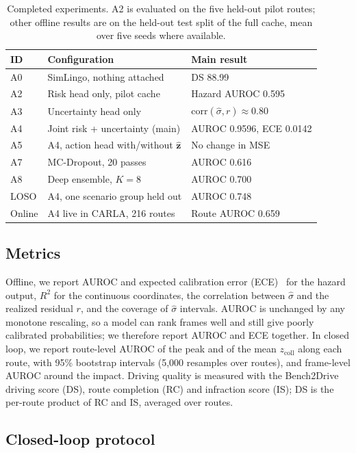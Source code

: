 \documentclass[conference]{IEEEtran}
\newcommand{\zcoll}{z_{\mathrm{coll}}}
\newcommand{\sighat}{\hat{\sigma}}
\begin{document}
\begin{table}[t]
\centering
\caption{Completed experiments. A2 is evaluated on the five held-out pilot
routes; other offline results are on the held-out test split of the full cache, mean
over five seeds where available.}
\label{tab:exp}
\footnotesize
\setlength{\tabcolsep}{3pt}
\begin{tabular}{@{}l l l@{}}
\toprule
ID & Configuration & Main result \\
\midrule
A0 & SimLingo, nothing attached & DS 88.99 \\
A2 & Risk head only, pilot cache & Hazard AUROC 0.595 \\
A3 & Uncertainty head only & $\mathrm{corr}(\sighat,r)\approx0.80$ \\
A4 & Joint risk + uncertainty (main) & AUROC 0.9596, ECE 0.0142 \\
A5 & A4, action head with/without $\hat{\mathbf{z}}$ & No change in MSE \\
A7 & MC-Dropout, 20 passes & AUROC 0.616 \\
A8 & Deep ensemble, $K=8$ & AUROC 0.700 \\
LOSO & A4, one scenario group held out & AUROC 0.748 \\
Online & A4 live in CARLA, 216 routes & Route AUROC 0.659 \\
\bottomrule
\end{tabular}
\end{table}

\subsection{Metrics}

Offline, we report AUROC and expected calibration error (ECE)~\cite{guo2017calibration}
for the hazard output, $R^2$ for the continuous coordinates, the correlation between
$\sighat$ and the realized residual $r$, and the coverage of $\sighat$ intervals.
AUROC is unchanged by any monotone rescaling, so a model can rank frames well and
still give poorly calibrated probabilities; we therefore report AUROC and ECE
together. In closed loop, we report route-level AUROC of the peak and of the mean
$\zcoll$ along each route, with 95\% bootstrap intervals (5{,}000 resamples over
routes), and frame-level AUROC around the impact. Driving quality is measured with
the Bench2Drive driving score (DS), route completion (RC) and infraction score (IS);
DS is the per-route product of RC and IS, averaged over routes.

\subsection{Closed-loop protocol}
\end{document}
